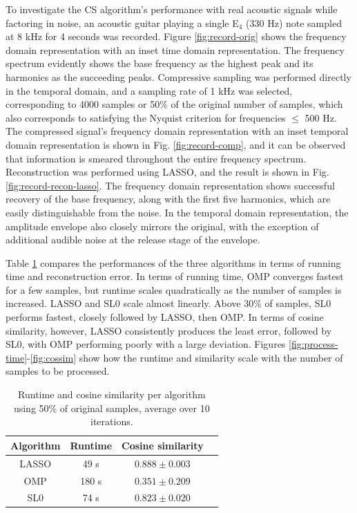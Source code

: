 \documentclass[10pt,a4paper,twoside]{article}
\begin{document}
To investigate the CS algorithm's performance with real acoustic signals while factoring in noise, an acoustic guitar playing a single E$_4$ (330 Hz) note sampled at 8 kHz for 4 seconds was recorded. Figure \ref{fig:record-orig} shows the frequency domain representation with an inset time domain representation. The frequency spectrum evidently shows the base frequency as the highest peak and its harmonics as the succeeding peaks. Compressive sampling was performed directly in the temporal domain, and a sampling rate of 1 kHz was selected, corresponding to 4000 samples or 50\% of the original number of samples, which also corresponds to satisfying the Nyquist criterion for frequencies $\leq$ 500 Hz. The compressed signal's frequency domain representation with an inset temporal domain representation is shown in Fig. \ref{fig:record-comp}, and it can be observed that information is smeared throughout the entire frequency spectrum. Reconstruction was performed using LASSO, and the result is shown in Fig. \ref{fig:record-recon-lasso}. The frequency domain representation shows successful recovery of the base frequency, along with the first five harmonics, which are easily distinguishable from the noise. In the temporal domain representation, the amplitude envelope also closely mirrors the original, with the exception of additional audible noise at the release stage of the envelope.

Table \ref{tab:compare} compares the performances of the three algorithms in terms of running time and reconstruction error. In terms of running time, OMP converges fastest for a few samples, but runtime scales quadratically as the number of samples is increased. LASSO and SL0 scale almost linearly. Above 30\% of samples, SL0 performs fastest, closely followed by LASSO, then OMP. In terms of cosine similarity, however, LASSO consistently produces the least error, followed by SL0, with OMP performing poorly with a large deviation. Figures \ref{fig:process-time}-\ref{fig:cossim} show how the runtime and similarity scale with the number of samples to be processed.

\begin{table}[!htb]
	\centering
	\caption{Runtime and cosine similarity per algorithm using 50\% of original samples, average over 10 iterations.}
	\begin{tabular}{|c|c|c|c|}
		\hline
		Algorithm & Runtime & Cosine similarity \\ \hline
		LASSO & 49 s & $0.888 \pm 0.003$ \\
		OMP & 180 s & $0.351 \pm 0.209$ \\ 
		SL0 & 74 s & $0.823 \pm 0.020$ \\ \hline
	\end{tabular}
	\label{tab:compare}
\end{table}
\end{document}
